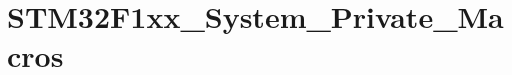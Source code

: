 \hypertarget{group__STM32F1xx__System__Private__Macros}{}\section{S\+T\+M32\+F1xx\+\_\+\+System\+\_\+\+Private\+\_\+\+Macros}
\label{group__STM32F1xx__System__Private__Macros}
